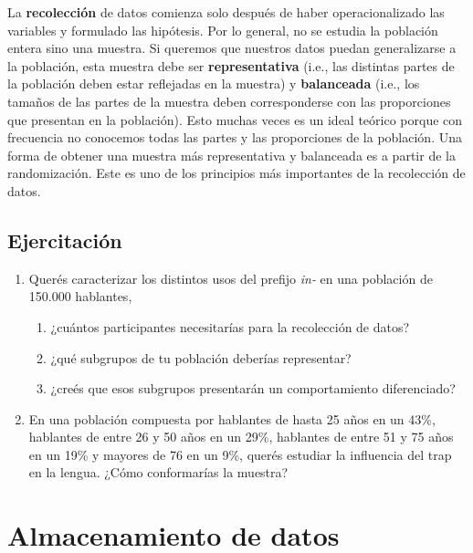 \documentclass[12pt,spanish,a4paper,]{article}
\providecommand{\tightlist}{%
  \setlength{\itemsep}{0pt}\setlength{\parskip}{0pt}}
\begin{document}
La \textbf{recolección} de datos comienza solo después de haber
operacionalizado las variables y formulado las hipótesis. Por lo
general, no se estudia la población entera sino una muestra. Si queremos
que nuestros datos puedan generalizarse a la población, esta muestra
debe ser \textbf{representativa} (i.e., las distintas partes de la
población deben estar reflejadas en la muestra) y \textbf{balanceada}
(i.e., los tamaños de las partes de la muestra deben corresponderse con
las proporciones que presentan en la población). Esto muchas veces es un
ideal teórico porque con frecuencia no conocemos todas las partes y las
proporciones de la población. Una forma de obtener una muestra más
representativa y balanceada es a partir de la randomización. Este es uno
de los principios más importantes de la recolección de datos.

\hypertarget{ejercitacion-5}{%
\subsection{Ejercitación}\label{ejercitacion-5}}

\begin{enumerate}
\def\labelenumi{\arabic{enumi}.}
\tightlist
\item
  Querés caracterizar los distintos usos del prefijo \emph{in-} en una
  población de 150.000 hablantes,

  \begin{enumerate}
  \def\labelenumii{\alph{enumii}.}
  \tightlist
  \item
    ¿cuántos participantes necesitarías para la recolección de datos?
  \item
    ¿qué subgrupos de tu población deberías representar?
  \item
    ¿creés que esos subgrupos presentarán un comportamiento
    diferenciado?
  \end{enumerate}
\item
  En una población compuesta por hablantes de hasta 25 años en un 43\%,
  hablantes de entre 26 y 50 años en un 29\%, hablantes de entre 51 y 75
  años en un 19\% y mayores de 76 en un 9\%, querés estudiar la
  influencia del trap en la lengua. ¿Cómo conformarías la muestra?
\end{enumerate}

\hypertarget{almacenamiento-de-datos}{%
\section{Almacenamiento de datos}\label{almacenamiento-de-datos}}
\end{document}
